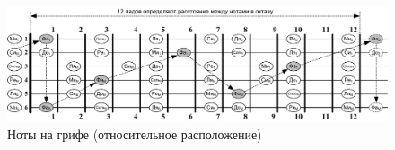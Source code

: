 \begin{figure}[!ht]
    \centering
    \includegraphics[width=\textwidth]{fig/notes-on-griph} 
    \caption{Ноты на грифе (относительное расположение)}\label{fig:notesOnGriph}
\end{figure} 



